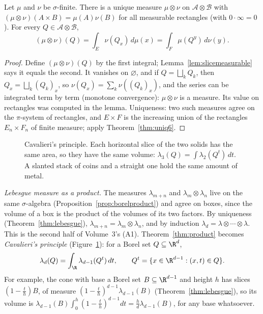 \begin{theorem}\label{thm:product}
Let $\mu$ and $\nu$ be $\sigma$-finite. There is a unique measure $\mu\otimes\nu$ on $\mathcal A\otimes\mathcal B$ with $(\mu\otimes\nu)(A\times B)=\mu(A)\nu(B)$ for all measurable rectangles (with $0\cdot\infty=0$). For every
$Q\in\mathcal A\otimes\mathcal B$,
\[(\mu\otimes\nu)(Q)=\int_E\nu(Q_x)\,d\mu(x)=\int_F\mu(Q^y)\,d\nu(y).\]
\end{theorem}
\begin{proof}
Define $(\mu\otimes\nu)(Q)$ by the first integral; Lemma~\ref{lem:slicemeasurable} says it equals the second. It vanishes on $\varnothing$, and if $Q=\bigsqcup_kQ_k$, then $Q_x=\bigsqcup_k(Q_k)_x$, so
$\nu(Q_x)=\sum_k\nu((Q_k)_x)$, and the series can be integrated term by term (monotone convergence): $\mu\otimes\nu$ is a measure. Its value on rectangles was computed in the lemma. Uniqueness: two such
measures agree on the $\pi$-system of rectangles, and $E\times F$ is the increasing union of the rectangles $E_n\times F_n$ of finite measure; apply Theorem~\ref{thm:uniq6}.
\end{proof}

\begin{figure}[ht]
\centering
{}
\caption{Cavalieri's principle. Each horizontal slice of the two solids has the same area, so they have the same volume:
$\lambda_3(Q)=\int\lambda_2(Q^t)\,dt$. A slanted stack of coins and a straight one hold the same amount of metal.}
\label{fig:cavalieri}
\end{figure}

\emph{Lebesgue measure as a product.} The measures $\lambda_{m+n}$ and $\lambda_m\otimes\lambda_n$ live on the same $\sigma$-algebra (Proposition~\ref{prop:borelproduct}) and agree on boxes, since the volume of a box is the
product of the volumes of its two factors. By uniqueness (Theorem~\ref{thm:lebesgue}), $\lambda_{m+n}=\lambda_m\otimes\lambda_n$, and by induction $\lambda_d=\lambda\otimes\cdots\otimes\lambda$. This is the second
half of Volume~3's (A1). Theorem~\ref{thm:product} becomes \emph{Cavalieri's principle} (Figure~\ref{fig:cavalieri}): for a Borel set $Q\subseteq\R^d$,
\[\lambda_d(Q)=\int_\R\lambda_{d-1}(Q^t)\,dt,\qquad Q^t=\{x\in\R^{d-1}:(x,t)\in Q\}.\]
For example, the cone with base a Borel set $B\subseteq\R^{d-1}$ and height $h$ has slices $(1-\frac th)B$, of measure $(1-\frac th)^{d-1}\lambda_{d-1}(B)$ (Theorem~\ref{thm:lebesgue}), so its volume is
$\lambda_{d-1}(B)\int_0^h(1-\frac th)^{d-1}dt=\frac hd\lambda_{d-1}(B)$, for any base whatsoever.

